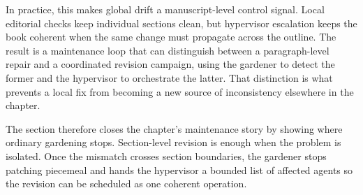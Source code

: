 \documentclass[11pt]{article}
\begin{document}
In practice, this makes global drift a manuscript-level control signal. Local editorial checks keep individual sections clean, but hypervisor escalation keeps the book coherent when the same change must propagate across the outline. The result is a maintenance loop that can distinguish between a paragraph-level repair and a coordinated revision campaign, using the gardener to detect the former and the hypervisor to orchestrate the latter. That distinction is what prevents a local fix from becoming a new source of inconsistency elsewhere in the chapter.

The section therefore closes the chapter's maintenance story by showing where ordinary gardening stops. Section-level revision is enough when the problem is isolated. Once the mismatch crosses section boundaries, the gardener stops patching piecemeal and hands the hypervisor a bounded list of affected agents so the revision can be scheduled as one coherent operation.
\end{document}
